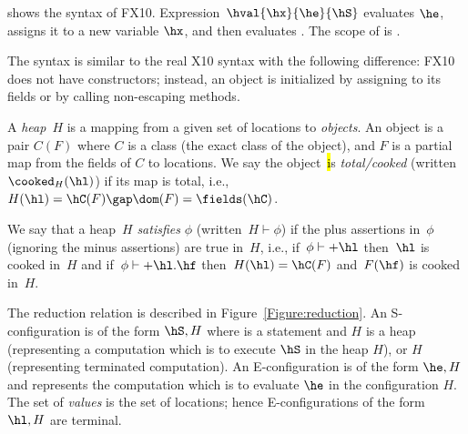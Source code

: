  shows the syntax of FX10.
Expression~$\hval{\hx}{\he}{\hS}$ evaluates $\he$, assigns it to a
new variable $\hx$, and then evaluates \hS. The scope of \hx{} is \hS.

The syntax is similar to the real X10 syntax with the following difference:
FX10 does not have constructors; instead, an object is initialized by assigning to its fields or
    by calling
    non-escaping methods.

A {\em heap}~$H$ is a mapping from a given set of locations to {\em
  objects}. An object is a pair $C(F)$ where $C$ is a class (the exact
class of the object), and $F$ is a partial map from the fields of $C$
to locations.
We say the object~\hl is {\em total/cooked} (written~$\cooked_H(\hl)$)
    if its map is total, i.e.,~$H(\hl)=\hC(F) \gap \dom(F)=\fields(\hC)$.

We say that a heap~$H$ {\em satisfies} $\phi$ (written~$H \vdash \phi$)
    if the plus assertions in~$\phi$ (ignoring the minus assertions) are true in~$H$,
    i.e., if~$\phi \vdash +\hl$ then~$\hl$ is cooked in~$H$
    and if~$\phi \vdash +\hl.\hf$ then~$H(\hl)=\hC(F)$ and~$F(\hf)$ is cooked in~$H$.



The reduction relation is described in
Figure~\ref{Figure:reduction}. An S-configuration is of the form
$\hS,H$ where \hS{} is a statement and $H$ is a heap (representing a
computation which is to execute $\hS$ in the heap $H$), or $H$
(representing terminated computation). An
E-configuration is of the form $\he,H$ and represents the
computation which is to evaluate $\he$ in the configuration $H$. The
set of {\em values} is the set of locations; hence E-configurations of
the form $\hl,H$ are terminal.

